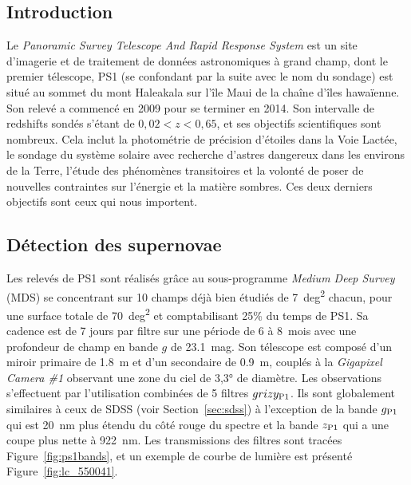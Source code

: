 \documentclass[../main/main.tex]{subfiles}
\begin{document}
\subsection{Introduction}\label{ssec:ps1intro}

Le \textit{Panoramic Survey Telescope And Rapid Response System}
\citep[Pan-STARRS,][]{chambers2016, scolnic2018} est un site d'imagerie et de
traitement de données astronomiques à grand champ, dont le premier télescope,
PS1 (se confondant par la suite avec le nom du sondage) est situé au sommet du
mont Haleakala sur l'île Maui de la chaîne d'îles hawaïenne. Son relevé a
commencé en 2009 pour se terminer en 2014. Son intervalle de redshifts sondés
s'étant de $0,02 < z < 0,65$, et ses objectifs scientifiques sont nombreux. Cela
inclut la photométrie de précision d'étoiles dans la Voie Lactée, le sondage du
système solaire avec recherche d'astres dangereux dans les environs de la Terre,
l'étude des phénomènes transitoires et la volonté de poser de nouvelles
contraintes sur l'énergie et la matière sombres. Ces deux derniers objectifs
sont ceux qui nous importent. 

\subsection{Détection des supernovae}\label{ssec:ps1detec}

Les relevés de PS1 sont réalisés grâce au sous-programme \textit{Medium Deep
Survey} (MDS) se concentrant sur 10 champs déjà bien étudiés de \SI{7}{deg^2}
chacun, pour une surface totale de \SI{70}{deg^2} et comptabilisant 25\% du
temps de PS1. Sa cadence est de 7 jours par filtre sur une période de 6 à
\SI{8}{mois} avec une profondeur de champ en bande $g$ de \SI{23,1}{mag}. Son
télescope \citep{hodapp2004} est composé d'un miroir primaire de \SI{1,8}{m} et
d'un secondaire de \SI{0,9}{m}, couplés à la \textit{Gigapixel Camera \#1}
\citep[GPC1,][]{kaiser2010, tonry2006} observant une zone du ciel de \ang{3,3;;}
de diamètre. Les observations s'effectuent par l'utilisation combinées de 5
filtres $grizy_{\rm P1}$. Ils sont globalement similaires à ceux de SDSS (voir
Section~\ref{sec:sdss}) à l'exception de la bande $g_{\rm P1}$ qui est
\SI{20}{nm} plus étendu du côté rouge du spectre et la bande $z_{\rm P1}$ qui a
une coupe plus nette à \SI{922}{nm}. Les transmissions des filtres sont tracées
Figure~\ref{fig:ps1bands}, et un exemple de courbe de lumière est présenté
Figure~\ref{fig:lc_550041}.
\end{document}

